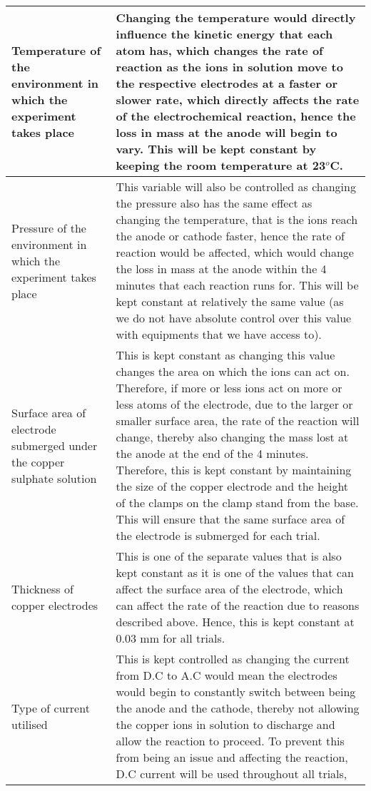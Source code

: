 \documentclass[11pt, a4]{article}
\begin{document}
\begin{longtable}{|>{\centering\arraybackslash}m{4.5cm}|>{\centering\arraybackslash}m{10.5cm}|}
				\hline
				Temperature of the environment in which the experiment takes place & Changing the temperature would directly influence the kinetic energy that each atom has, which changes the rate of reaction as the ions in solution move to the respective electrodes at a faster or slower rate, which directly affects the rate of the electrochemical reaction, hence the loss in mass at the anode will begin to vary. This will be kept constant by keeping the room temperature at 23$^{o}$C.\\
				\hline
				Pressure of the environment in which the experiment takes place & This variable will also be controlled as changing the pressure also has the same effect as changing the temperature, that is the ions reach the anode or cathode faster, hence the rate of reaction would be affected, which would change the loss in mass at the anode within the 4 minutes that each reaction runs for. This will be kept constant at relatively the same value (as we do not have absolute control over this value with equipments that we have access to).\\
				\hline
				Surface area of electrode submerged under the copper sulphate solution & This is kept constant as changing this value changes the area on which the ions can act on. Therefore, if more or less ions act on more or less atoms of the electrode, due to the larger or smaller surface area, the rate of the reaction will change, thereby also changing the mass lost at the anode at the end of the 4 minutes. Therefore, this is kept constant by maintaining the size of the copper electrode and the height of the clamps on the clamp stand from the base. This will ensure that the same surface area of the electrode is submerged for each trial.\\
				\hline 
				Thickness of copper electrodes & This is one of the separate values that is also kept constant as it is one of the values that can affect the surface area of the electrode, which can affect the rate of the reaction due to reasons described above. Hence, this is kept constant at 0.03 mm for all trials.\\
				\hline
				Type of current utilised & This is kept controlled as changing the current from D.C to A.C would mean the electrodes would begin to constantly switch between being the anode and the cathode, thereby not allowing the copper ions in solution to discharge and allow the reaction to proceed. To prevent this from being an issue and affecting the reaction, D.C current will be used throughout all trials,\\

\end{longtable}
\end{document}
